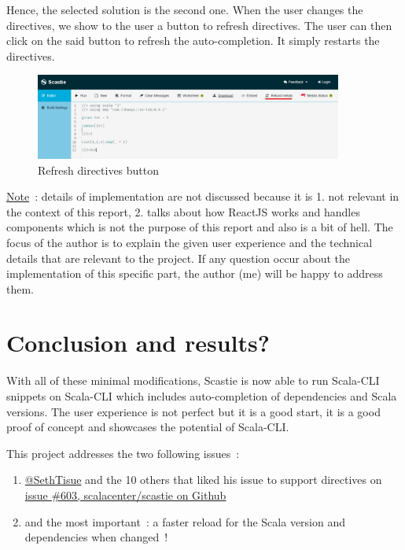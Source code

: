 \documentclass{article}
\begin{document}
Hence, the selected solution is the second one. When the user changes the directives, we show to the user a button to refresh directives. The user can then click on the said button to refresh the auto-completion. It simply restarts the directives.

\begin{figure}[H]
    \centering
    \includegraphics[width=0.9\textwidth]{scastie_reloadmetals.png}
    \caption{Refresh directives button}
\end{figure}

\underline{Note}~: details of implementation are not discussed because it is 1. not relevant in the context of this report, 2. talks about how ReactJS works and handles components which is not the purpose of this report and also is a bit of hell. The focus of the author is to explain the given user experience and the technical details that are relevant to the project. If any question occur about the implementation of this specific part, the author (me) will be happy to address them.

\section{Conclusion and results?}

With all of these minimal modifications, Scastie is now able to run Scala-CLI snippets on Scala-CLI which includes auto-completion of dependencies and Scala versions. The user experience is not perfect but it is a good start, it is a good proof of concept and showcases the potential of Scala-CLI.

This project addresses the two following issues~:

\begin{enumerate}
    \item \href{https://github.com/SethTisue}{@SethTisue} and the 10 others that liked his issue to support directives on \href{https://github.com/scalacenter/scastie/issues/603}{issue \#603, scalacenter/scastie on Github}
    \item and the most important~: a faster reload for the Scala version and dependencies when changed~!
\end{enumerate}
\end{document}
